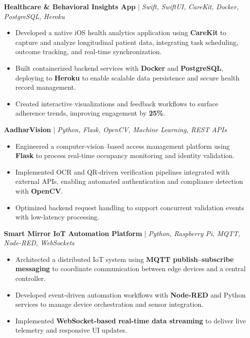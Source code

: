 \documentclass[letterpaper,11pt]{article}
\begin{document}
\textbf{Healthcare \& Behavioral Insights App} \;|\; \textit{Swift, SwiftUI, CareKit, Docker, PostgreSQL, Heroku} \\
\begin{itemize}[noitemsep]
    \item Developed a native iOS health analytics application using \textbf{CareKit} to capture and analyze longitudinal patient data, integrating task scheduling, outcome tracking, and real-time synchronization.
    \item Built containerized backend services with \textbf{Docker} and \textbf{PostgreSQL}, deploying to \textbf{Heroku} to enable scalable data persistence and secure health record management.
    \item Created interactive visualizations and feedback workflows to surface adherence trends, improving engagement by \textbf{25\%}.
\end{itemize}

\textbf{AadharVision} \;|\; \textit{Python, Flask, OpenCV, Machine Learning, REST APIs} \\
\begin{itemize}[noitemsep]
    \item Engineered a computer-vision–based access management platform using \textbf{Flask} to process real-time occupancy monitoring and identity validation.
    \item Implemented OCR and QR-driven verification pipelines integrated with external APIs, enabling automated authentication and compliance detection with \textbf{OpenCV}.
    \item Optimized backend request handling to support concurrent validation events with low-latency processing.
\end{itemize}

\textbf{Smart Mirror IoT Automation Platform} \;|\; \textit{Python, Raspberry Pi, MQTT, Node-RED, WebSockets} \\
\begin{itemize}[noitemsep]
    \item Architected a distributed IoT system using \textbf{MQTT publish–subscribe messaging} to coordinate communication between edge devices and a central controller.
    \item Developed event-driven automation workflows with \textbf{Node-RED} and Python services to manage device orchestration and sensor integration.
    \item Implemented \textbf{WebSocket-based real-time data streaming} to deliver live telemetry and responsive UI updates.
\end{itemize}
\end{document}
